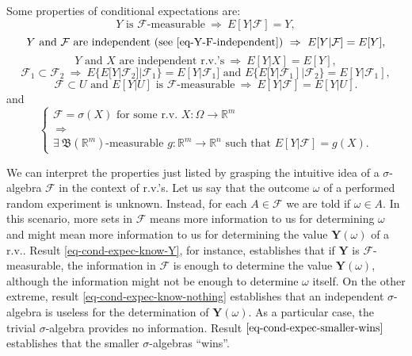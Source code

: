 Some properties of conditional expectations are:
\begin{equation}\label{eq-cond-expec-know-Y}
Y\mbox{ is }\mathcal{F}\mbox{-measurable}
~\Rightarrow~
E[Y|\mathcal{F}]=Y,
\end{equation}
\begin{equation}\label{eq-cond-expec-know-nothing}
Y\mbox{ and }\mathcal{F}\mbox{ are independent (see }\eqref{eq-Y-F-independent}\mbox{)}
~\Rightarrow~
E[Y|\mathcal{F}]=E[Y],
\end{equation}
\begin{equation}\label{eq-cond-expec-independent-rvs}
Y\mbox{ and }X\mbox{ are independent r.v.'s}
~\Rightarrow~
E[Y|X]=E[Y],
\end{equation}
\begin{equation}\label{eq-cond-expec-smaller-wins}
\mathcal{F}_1\subset\mathcal{F}_2
~\Rightarrow~
E\{E[Y|\mathcal{F}_2]|\mathcal{F}_1\} = E[Y|\mathcal{F}_1]\mbox{ and }E\{E[Y|\mathcal{F}_1]|\mathcal{F}_2\} = E[Y|\mathcal{F}_1],
\end{equation}
\begin{equation}\label{eq-cond-expec-f-u}
\mathcal{F}\subset U\mbox{ and }E[Y|U]\mbox{ is }\mathcal{F}\mbox{-measurable}
~\Rightarrow~
E[Y|\mathcal{F}] = E[Y|U].
\end{equation}
and
\begin{equation}\label{eq-cond-expec-exists-g}
\left\{
\begin{array}{c}
\mathcal{F}=\sigma(X)\mbox{ for some r.v. }X:\Omega\rightarrow\mathbb{R}^m \\
~\Rightarrow~ \\
\exists~\mathfrak{B}(\mathbb{R}^m)\mbox{-measurable }g:\mathbb{R}^m\rightarrow\mathbb{R}^n\mbox{ such that }E[Y|\mathcal{F}] = g(X).
\end{array}
\right.
\end{equation}

We can interpret the properties just listed by grasping the intuitive idea of a $\sigma$-algebra $\mathcal{F}$ in the context of r.v.'s.
Let us say that the outcome $\omega$ of a performed random experiment is unknown. Instead, for each $A\in\mathcal{F}$ we are told if $\omega\in A$.
In this scenario, more sets in $\mathcal{F}$ means more information to us for determining $\omega$ and might mean more information to us for determining the value $\mathbf{Y}(\omega)$ of a r.v..
Result \eqref{eq-cond-expec-know-Y}, for instance, establishes that if $\mathbf{Y}$ is $\mathcal{F}$-measurable, the information in $\mathcal{F}$ is enough to determine the value $\mathbf{Y}(\omega)$,
although the information might not be enough to determine $\omega$ itself.
On the other extreme, result \eqref{eq-cond-expec-know-nothing} establishes that an independent $\sigma$-algebra is useless for the determination of $\mathbf{Y}(\omega)$.
As a particular case, the trivial $\sigma$-algebra provides no information.
Result $\eqref{eq-cond-expec-smaller-wins}$ establishes that the smaller $\sigma$-algebras ``wins''.

